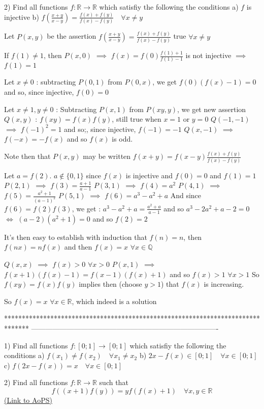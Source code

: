 \begin{solution}
	\begin{tcolorbox}2)  Find all functions $f:\mathbb{R}\to\mathbb{R}$ which satisfiy the following the conditions
a) $f$ is injective
b) $f\left(\frac{x+y}{x-y} \right) =\frac{f(x)+f(y)}{f(x)-f(y)} \quad \forall x\neq y$\end{tcolorbox}
Let $P(x,y)$ be the assertion $f\left(\frac{x+y}{x-y}\right)=\frac{f(x)+f(y)}{f(x)-f(y)}$ true $\forall x\ne y$

If $f(1)\ne 1$, then $P(x,0)$ $\implies$ $f(x)=f(0)\frac{f(1)+1}{f(1)-1}$ is not injective $\implies$ $f(1)=1$

Let $x\ne 0$ : subtracting $P(0,1)$ from $P(0,x)$, we get $f(0)(f(x)-1)=0$ and so, since injective, $f(0)=0$

Let $x\ne 1,y\ne 0$ : Subtracting $P(x,1)$ from $P(xy,y)$, we get new assertion $Q(x,y)$ : $f(xy)=f(x)f(y)$, still true when $x=1$ or $y=0$
$Q(-1,-1)$ $\implies$ $f(-1)^2=1$ and so;, since injective, $f(-1)=-1$
$Q(x,-1)$ $\implies$ $f(-x)=-f(x)$ and so $f(x)$ is odd.

Note then that $P(x,y)$ may be written $f(x+y)=f(x-y)\frac{f(x)+f(y)}{f(x)-f(y)}$

Let $a=f(2)$. $a\notin\{0,1\}$ since $f(x)$ is injective and $f(0)=0$ and $f(1)=1$
$P(2,1)$ $\implies$ $f(3)=\frac{a+1}{a-1}$
$P(3,1)$ $\implies$ $f(4)=a^2$
$P(4,1)$ $\implies$ $f(5)=\frac{a^2+1}{(a-1)^2}$
$P(5,1)$ $\implies$ $f(6)=a^3-a^2+a$
And since $f(6)=f(2)f(3)$, we get :
$a^3-a^2+a=\frac{a^2+a}{a-1}$ and so $a^3-2a^2+a-2=0$ $\iff$ $(a-2)(a^2+1)=0$ and so $f(2)=2$

It's then easy to establish with induction that $f(n)=n$, then  $f(nx)=nf(x)$ and then $f(x)=x$ $\forall x\in\mathbb Q$

$Q(x,x)$ $\implies$  $f(x)>0$ $\forall x>0$
$P(x,1)$ $\implies$ $f(x+1)(f(x)-1)=f(x-1)(f(x)+1)$ and so $f(x)>1$ $\forall x>1$
So $f(xy)=f(x)f(y)$ implies then (choose $y>1$) that $f(x)$ is increasing.

So $\boxed{f(x)=x}$ $\forall x\in\mathbb R$, which indeed is a solution
\end{solution}
*******************************************************************************
-------------------------------------------------------------------------------

\begin{problem}
	1) Find all functions $f:[0;1]\to [0;1]$  which satisfiy the following the conditions 
a) $f(x_{1})\neq f(x_{2}) \quad \forall x_{1}\neq x_{2}$
b) $2x-f(x)\in [0;1] \quad \forall x\in [0;1]$
c) $f(2x-f(x))=x \quad \forall x\in [0;1]$

2) Find all functions $f:\mathbb{R}\to\mathbb{R}$ such that
\[f((x+1)f(y))=yf(f(x)+1) \quad \forall x,y \in \mathbb{R}\]
	\flushright \href{https://artofproblemsolving.com/community/c6h563122}{(Link to AoPS)}
\end{problem}



